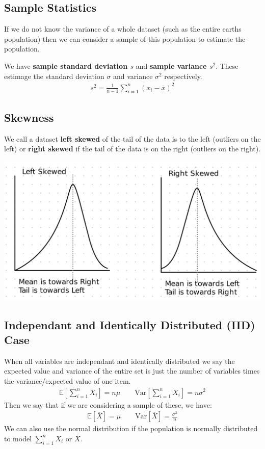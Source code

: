 \documentclass[12pt,letterpaper]{article} \usepackage{amsmath} \usepackage{graphicx} \usepackage[margin=1in]{geometry} \usepackage{longtable}  \usepackage{amssymb}
\begin{document}
	\subsection{Sample Statistics}
	If we do not know the variance of a whole dataset (such as the entire earths population) then we can consider a sample of this population to estimate the population. 
	
	We have \textbf{sample standard deviation $s$} and \textbf{sample variance $s^2$}. These estimage the standard deviation $\sigma$ and variance $\sigma^2$ respectively. 
	\begin{align*}
		s^2 = \frac{1}{n-1}\sum^{n}_{i=1}(x_i - \overline x)^2
	\end{align*}

	\subsection{Skewness}
	We call a dataset \textbf{left skewed} of the tail of the data is to the left (outliers on the left) or \textbf{right skewed} if the tail of the data is on the right (outliers on the right).
	\begin{center}
		\includegraphics[width=0.6\linewidth]{skew}
	\end{center}

	\subsection{Independant and Identically Distributed (IID) Case}
	When all variables are independant and identically distributed we say the expected value and variance of the entire set is just the number of variables times the variance/expected value of one item.
	\begin{align*}
		\mathbb E\left[\sum_{i=1}^{n}X_i\right]=n\mu \qquad \text{Var}\left[\sum_{i=1}^{n}X_i\right]=n\sigma^2
	\end{align*}
	Then we say that if we are considering a sample of these, we have:
	\begin{align*}
		\mathbb E [\overline X] = \mu \qquad \text{Var} [\overline X] = \frac{\sigma^2}{n}
	\end{align*}
	We can also use the normal distribution if the population is normally distributed to model $\sum_{i=1}^n X_i$ or $\overline X$.
	
\end{document}
